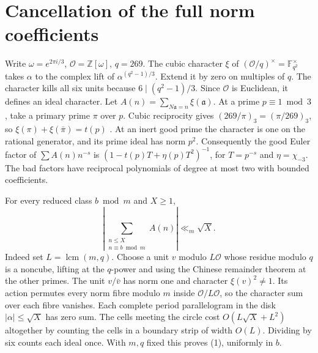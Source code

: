 \documentclass[11pt]{article}
\newcommand{\OO}{\mathcal O}
\begin{document}
\section{Cancellation of the full norm coefficients}
Write $\omega=e^{2\pi i/3}$, $\OO=\mathbb Z[\omega]$, $q=269$. The cubic character $\xi$ of $(\OO/q)^\times=\mathbb F_{q^2}^\times$ takes $\alpha$ to the complex lift of $\alpha^{(q^2-1)/3}$. Extend it by zero on multiples of $q$. The character kills all six units because $6\mid(q^2-1)/3$. Since $\OO$ is Euclidean, it defines an ideal character. Let $A(n)=\sum_{N\mathfrak a=n}\xi(\mathfrak a)$. At a prime $p\equiv1\bmod3$, take a primary prime $\pi$ over $p$. Cubic reciprocity gives $(269/\pi)_3=(\pi/269)_3$, so $\xi(\pi)+\xi(\bar\pi)=t(p)$ \cite[Lemma 4]{mer}. At an inert good prime the character is one on the rational generator, and its prime ideal has norm $p^2$. Consequently the good Euler factor of $\sum A(n)n^{-s}$ is $(1-t(p)T+\eta(p)T^2)^{-1}$, for $T=p^{-s}$ and $\eta=\chi_{-3}$. The bad factors have reciprocal polynomials of degree at most two with bounded coefficients.

For every reduced class $b\bmod m$ and $X\ge1$,
\[
 \left|\sum_{\substack{n\le X\\ n\equiv b\bmod m}}A(n)\right|\ll_m\sqrt X . \tag{1}
\]
Indeed set $L=\operatorname{lcm}(m,q)$. Choose a unit $v$ modulo $L\OO$ whose residue modulo $q$ is a noncube, lifting at the $q$-power and using the Chinese remainder theorem at the other primes. The unit $v/\bar v$ has norm one and character $\xi(v)^2\ne1$. Its action permutes every norm fibre modulo $m$ inside $\OO/L\OO$, so the character sum over each fibre vanishes. Each complete period parallelogram in the disk $|\alpha|\le\sqrt X$ has zero sum. The cells meeting the circle cost $O(L\sqrt X+L^2)$ altogether by counting the cells in a boundary strip of width $O(L)$. Dividing by six counts each ideal once. With $m,q$ fixed this proves (1), uniformly in $b$.
\end{document}

